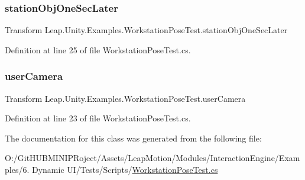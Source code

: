 \subsubsection{\texorpdfstring{stationObjOneSecLater}{stationObjOneSecLater}}
{\footnotesize\ttfamily Transform Leap.\+Unity.\+Examples.\+Workstation\+Pose\+Test.\+station\+Obj\+One\+Sec\+Later}



Definition at line 25 of file Workstation\+Pose\+Test.\+cs.

\mbox{\label{class_leap_1_1_unity_1_1_examples_1_1_workstation_pose_test_ab3438a13f7ef73ffaf14a16247bd2984}} 
\subsubsection{\texorpdfstring{userCamera}{userCamera}}
{\footnotesize\ttfamily Transform Leap.\+Unity.\+Examples.\+Workstation\+Pose\+Test.\+user\+Camera}



Definition at line 23 of file Workstation\+Pose\+Test.\+cs.



The documentation for this class was generated from the following file\+:\begin{DoxyCompactItemize}
\item 
O\+:/\+Git\+H\+U\+B\+M\+I\+N\+I\+P\+Roject/\+Assets/\+Leap\+Motion/\+Modules/\+Interaction\+Engine/\+Examples/6. Dynamic U\+I/\+Tests/\+Scripts/\mbox{\hyperlink{_workstation_pose_test_8cs}{Workstation\+Pose\+Test.\+cs}}\end{DoxyCompactItemize}
